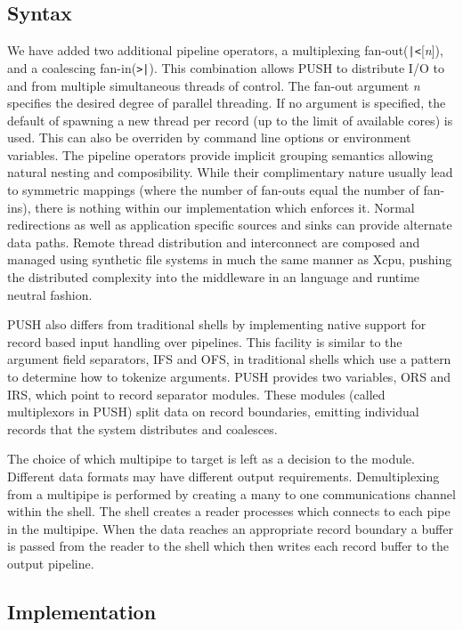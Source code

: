 \documentclass{sig-alt-release2}
\begin{document}
\subsection{Syntax}
We have added two additional pipeline operators, 
a multiplexing fan-out(\verb!|<![\emph{n}]), and a coalescing fan-in(\verb!>|!). 
This combination allows PUSH to distribute I/O to and from multiple
simultaneous threads of control.
The fan-out argument \emph{n} specifies the desired degree of parallel 
threading.  If no argument is specified, the default of spawning a new
thread per record (up to the limit of available cores) is used.  This can
also be overriden by command line options or environment variables.
The pipeline operators provide implicit grouping semantics allowing natural 
nesting and composibility.
While their complimentary nature usually lead to symmetric
mappings (where the number of fan-outs equal the number of fan-ins), there is 
nothing within our implementation which enforces it.
Normal redirections as well as application specific sources and sinks 
can provide alternate data paths.
Remote thread distribution and interconnect are composed and managed
using synthetic file systems in much the same manner as Xcpu, 
pushing the distributed complexity into the middleware in an language and 
runtime neutral fashion.

PUSH also differs from traditional shells by implementing native support for 
record based input handling over pipelines. This facility is similar to the 
argument field separators, IFS and OFS, in traditional shells which use a 
pattern to determine how to tokenize arguments. PUSH provides two variables, 
ORS and IRS, which point to record separator modules. These modules 
(called multiplexors in PUSH) split data on record boundaries, emitting 
individual records that the system distributes and coalesces. 

The choice of which multipipe to target is left as a decision to the module. 
Different data formats may have different output requirements. 
Demultiplexing from a multipipe is performed by creating a many to one 
communications channel within the shell. The shell creates a reader processes 
which connects to each pipe in the multipipe. When the data reaches an 
appropriate record boundary a buffer is passed from the reader to the shell 
which then writes each record buffer to the output pipeline. 



\subsection{Implementation}
\end{document}
